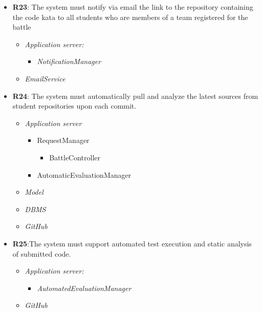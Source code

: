 \begin{itemize}
     
    \item \textbf{R23}: The system must notify via email the link to the repository containing the code kata to all students
who are members of a team registered for the battle
             \begin{itemize}
                 \item \textit{Application server:}\begin{itemize}
                     \item \textit{NotificationManager}
                 \end{itemize}
                \item \textit{EmailService}
                \end{itemize}
            
 \item \textbf{R24}: The system must automatically pull and analyze the latest sources from student repositories upon
each commit.
\begin{itemize}
    \item \textit{Application server}
    \begin{itemize}
        \item RequestManager
        \begin{itemize}
            \item BattleController
        \end{itemize}
        \item AutomaticEvaluationManager
    \end{itemize}
    \item \textit{Model}
    \item \textit{DBMS}
    \item \textit{GitHub}
\end{itemize}

           
        
        \item \textbf{R25}:The system must support automated test execution and static analysis of submitted code.
            \begin{itemize}
            \item \textit{Application server:}
            \begin{itemize}
                 \item \textit{AutomatedEvaluationManager}
            \end{itemize}
            \item \textit{GitHub}
                \end{itemize}
        

\end{itemize}
